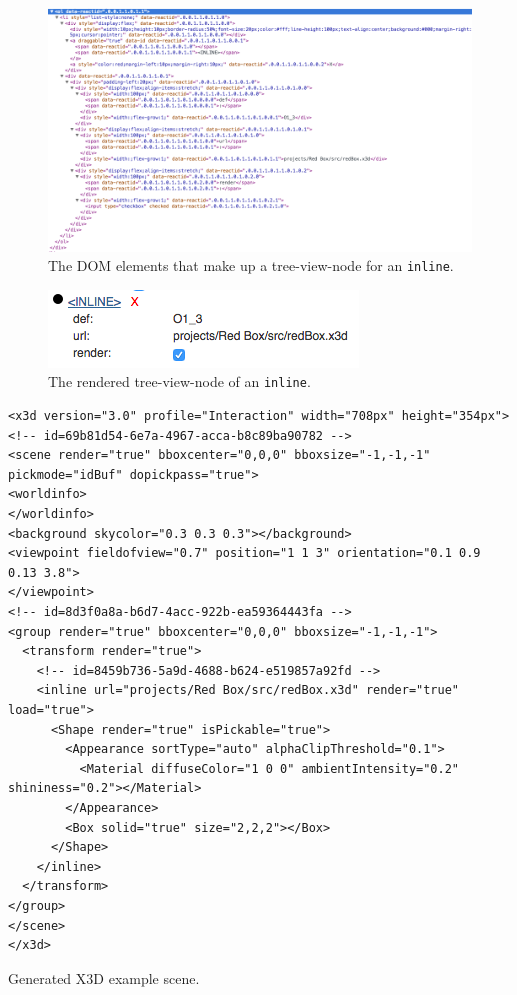 \begin{figure}
  \centering
  \includegraphics[width=\textwidth]{../assets/treeview-node-dom.png}
  \caption{The \gls{DOM} elements that make up a tree-view-node for an \texttt{inline}.}
  \label{fig:tree-view-node-dom}
\end{figure}

\begin{figure}
  \centering
  \includegraphics[width=.5\textwidth]{../assets/tree-view-node-rendered.png}
  \caption{The rendered tree-view-node of an \texttt{inline}.}
  \label{fig:tree-view-node-rendered}
\end{figure}

\begin{listing}
  \begin{verbatim}
<x3d version="3.0" profile="Interaction" width="708px" height="354px">
<!-- id=69b81d54-6e7a-4967-acca-b8c89ba90782 -->
<scene render="true" bboxcenter="0,0,0" bboxsize="-1,-1,-1" pickmode="idBuf" dopickpass="true">
<worldinfo>
</worldinfo>
<background skycolor="0.3 0.3 0.3"></background>
<viewpoint fieldofview="0.7" position="1 1 3" orientation="0.1 0.9 0.13 3.8">
</viewpoint>
<!-- id=8d3f0a8a-b6d7-4acc-922b-ea59364443fa -->
<group render="true" bboxcenter="0,0,0" bboxsize="-1,-1,-1">
  <transform render="true">
    <!-- id=8459b736-5a9d-4688-b624-e519857a92fd -->
    <inline url="projects/Red Box/src/redBox.x3d" render="true" load="true">
      <Shape render="true" isPickable="true">
        <Appearance sortType="auto" alphaClipThreshold="0.1">
          <Material diffuseColor="1 0 0" ambientIntensity="0.2" shininess="0.2"></Material>
        </Appearance>
        <Box solid="true" size="2,2,2"></Box>
      </Shape>
    </inline>
  </transform>
</group>
</scene>
</x3d>
  \end{verbatim}
	\caption{Generated \gls{X3D} example scene.}
	\label{list:x3dscene}
\end{listing}

